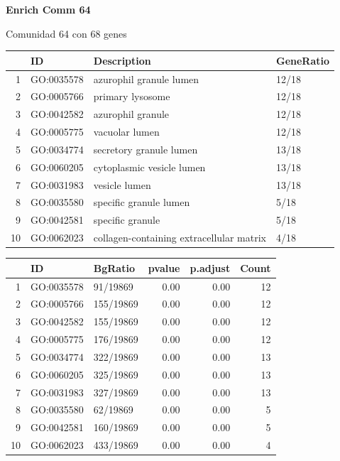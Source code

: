 \newpage

\textbf{Enrich Comm 64}

Comunidad 64 con 68 genes

\hfill

\begin{table}[ht]
\centering
\begin{tabular}{rlll}
  \hline
 & ID & Description & GeneRatio \\ 
  \hline
1 & GO:0035578 & azurophil granule lumen & 12/18 \\ 
  2 & GO:0005766 & primary lysosome & 12/18 \\ 
  3 & GO:0042582 & azurophil granule & 12/18 \\ 
  4 & GO:0005775 & vacuolar lumen & 12/18 \\ 
  5 & GO:0034774 & secretory granule lumen & 13/18 \\ 
  6 & GO:0060205 & cytoplasmic vesicle lumen & 13/18 \\ 
  7 & GO:0031983 & vesicle lumen & 13/18 \\ 
  8 & GO:0035580 & specific granule lumen & 5/18 \\ 
  9 & GO:0042581 & specific granule & 5/18 \\ 
  10 & GO:0062023 & collagen-containing extracellular matrix & 4/18 \\
   \hline
\end{tabular}
\end{table}

\begin{table}[ht]
\centering
\begin{tabular}{rllrrr}
  \hline
 & ID & BgRatio & pvalue & p.adjust & Count \\ 
  \hline
1 & GO:0035578 & 91/19869 & 0.00 & 0.00 &  12 \\ 
  2 & GO:0005766 & 155/19869 & 0.00 & 0.00 &  12 \\ 
  3 & GO:0042582 & 155/19869 & 0.00 & 0.00 &  12 \\ 
  4 & GO:0005775 & 176/19869 & 0.00 & 0.00 &  12 \\ 
  5 & GO:0034774 & 322/19869 & 0.00 & 0.00 &  13 \\ 
  6 & GO:0060205 & 325/19869 & 0.00 & 0.00 &  13 \\ 
  7 & GO:0031983 & 327/19869 & 0.00 & 0.00 &  13 \\ 
  8 & GO:0035580 & 62/19869 & 0.00 & 0.00 &   5 \\ 
  9 & GO:0042581 & 160/19869 & 0.00 & 0.00 &   5 \\ 
  10 & GO:0062023 & 433/19869 & 0.00 & 0.00 &   4 \\
   \hline
\end{tabular}
\end{table}

